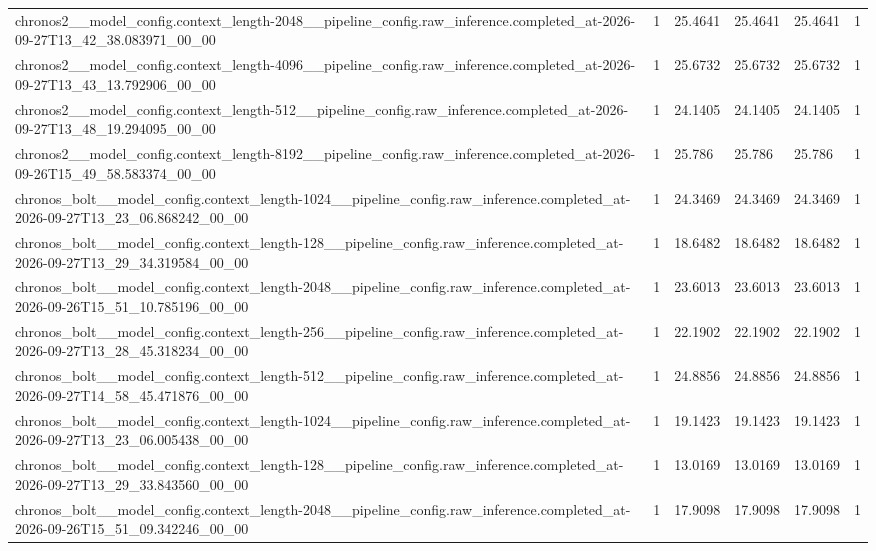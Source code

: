 \begin{tabular}{llllll}
chronos2\_\_model\_config.context\_length-2048\_\_pipeline\_config.raw\_inference.completed\_at-2026-09-27T13\_42\_38.083971\_00\_00 & 1 & 25.4641 & 25.4641 & 25.4641 & 1 \\
chronos2\_\_model\_config.context\_length-4096\_\_pipeline\_config.raw\_inference.completed\_at-2026-09-27T13\_43\_13.792906\_00\_00 & 1 & 25.6732 & 25.6732 & 25.6732 & 1 \\
chronos2\_\_model\_config.context\_length-512\_\_pipeline\_config.raw\_inference.completed\_at-2026-09-27T13\_48\_19.294095\_00\_00 & 1 & 24.1405 & 24.1405 & 24.1405 & 1 \\
chronos2\_\_model\_config.context\_length-8192\_\_pipeline\_config.raw\_inference.completed\_at-2026-09-26T15\_49\_58.583374\_00\_00 & 1 & 25.786 & 25.786 & 25.786 & 1 \\
chronos\_bolt\_\_model\_config.context\_length-1024\_\_pipeline\_config.raw\_inference.completed\_at-2026-09-27T13\_23\_06.868242\_00\_00 & 1 & 24.3469 & 24.3469 & 24.3469 & 1 \\
chronos\_bolt\_\_model\_config.context\_length-128\_\_pipeline\_config.raw\_inference.completed\_at-2026-09-27T13\_29\_34.319584\_00\_00 & 1 & 18.6482 & 18.6482 & 18.6482 & 1 \\
chronos\_bolt\_\_model\_config.context\_length-2048\_\_pipeline\_config.raw\_inference.completed\_at-2026-09-26T15\_51\_10.785196\_00\_00 & 1 & 23.6013 & 23.6013 & 23.6013 & 1 \\
chronos\_bolt\_\_model\_config.context\_length-256\_\_pipeline\_config.raw\_inference.completed\_at-2026-09-27T13\_28\_45.318234\_00\_00 & 1 & 22.1902 & 22.1902 & 22.1902 & 1 \\
chronos\_bolt\_\_model\_config.context\_length-512\_\_pipeline\_config.raw\_inference.completed\_at-2026-09-27T14\_58\_45.471876\_00\_00 & 1 & 24.8856 & 24.8856 & 24.8856 & 1 \\
chronos\_bolt\_\_model\_config.context\_length-1024\_\_pipeline\_config.raw\_inference.completed\_at-2026-09-27T13\_23\_06.005438\_00\_00 & 1 & 19.1423 & 19.1423 & 19.1423 & 1 \\
chronos\_bolt\_\_model\_config.context\_length-128\_\_pipeline\_config.raw\_inference.completed\_at-2026-09-27T13\_29\_33.843560\_00\_00 & 1 & 13.0169 & 13.0169 & 13.0169 & 1 \\
chronos\_bolt\_\_model\_config.context\_length-2048\_\_pipeline\_config.raw\_inference.completed\_at-2026-09-26T15\_51\_09.342246\_00\_00 & 1 & 17.9098 & 17.9098 & 17.9098 & 1 \\

\end{tabular}
